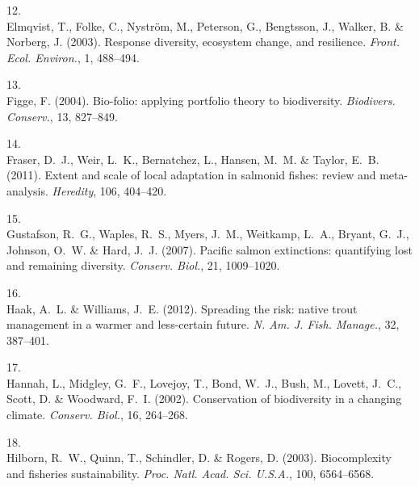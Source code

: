 \documentclass[11pt]{article}
\begin{document}
\begin{spacing}{1.6}
\begin{thebibliography}{50}
12.\\
Elmqvist, T., Folke, C., Nystr{\"o}m, M., Peterson, G., Bengtsson, J., Walker,
  B. \& Norberg, J. (2003).
\newblock Response diversity, ecosystem change, and resilience.
\newblock \emph{Front. Ecol. Environ.}, 1, 488--494.

13.\\
Figge, F. (2004).
\newblock Bio-folio: applying portfolio theory to biodiversity.
\newblock \emph{Biodivers. Conserv.}, 13, 827--849.

14.\\
Fraser, D.~J., Weir, L.~K., Bernatchez, L., Hansen, M.~M. \& Taylor, E.~B.
  (2011).
\newblock Extent and scale of local adaptation in salmonid fishes: review and
  meta-analysis.
\newblock \emph{Heredity}, 106, 404--420.

15.\\
Gustafson, R.~G., Waples, R.~S., Myers, J.~M., Weitkamp, L.~A., Bryant, G.~J.,
  Johnson, O.~W. \& Hard, J.~J. (2007).
\newblock Pacific salmon extinctions: quantifying lost and remaining diversity.
\newblock \emph{Conserv. Biol.}, 21, 1009--1020.

16.\\
Haak, A.~L. \& Williams, J.~E. (2012).
\newblock Spreading the risk: native trout management in a warmer and
  less-certain future.
\newblock \emph{N. Am. J. Fish. Manage.}, 32, 387--401.

17.\\
Hannah, L., Midgley, G.~F., Lovejoy, T., Bond, W.~J., Bush, M., Lovett, J.~C.,
  Scott, D. \& Woodward, F.~I. (2002).
\newblock Conservation of biodiversity in a changing climate.
\newblock \emph{Conserv. Biol.}, 16, 264--268.

18.\\
Hilborn, R.~W., Quinn, T., Schindler, D. \& Rogers, D. (2003).
\newblock Biocomplexity and fisheries sustainability.
\newblock \emph{Proc. Natl. Acad. Sci. U.S.A.}, 100, 6564--6568.


\end{thebibliography}
\end{spacing}
\end{document}
